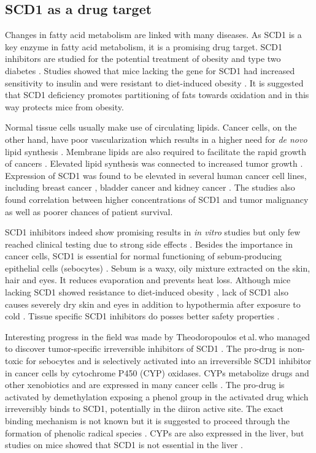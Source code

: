 \subsection{SCD1 as a drug target}
Changes in fatty acid metabolism are linked with many diseases. As SCD1 is a key enzyme in fatty acid metabolism, it is a promising drug target. SCD1 inhibitors are studied for the potential treatment of obesity and type two diabetes \cite{Dobrzyn2005}. Studies showed that mice lacking the gene for SCD1 had increased sensitivity to insulin and were resistant to diet-induced obesity \cite{Ntambi2002}. It is suggested that SCD1 deficiency promotes partitioning of fats towards oxidation and in this way protects mice from obesity.

Normal tissue cells usually make use of circulating lipids. Cancer cells, on the other hand, have poor vascularization which results in a higher need for \textit{de novo} lipid synthesis \cite{Ackerman2014}. Membrane lipids are also required to facilitate the rapid growth of cancers \cite{Snaebjornsson2020}. Elevated lipid synthesis was connected to increased tumor growth \cite{Swinnen2006}. Expression of SCD1 was found to be elevated in several human cancer cell lines, including breast cancer \cite{Holder2013}, bladder cancer \cite{Presler2018} and kidney cancer \cite{Wang2015}. The studies also found correlation between higher concentrations of SCD1 and tumor malignancy as well as poorer chances of patient survival.

SCD1 inhibitors indeed show promising results in \textit{in vitro} studies but only few reached clinical testing due to strong side effects \cite{Zhang2014}. Besides the importance in cancer cells, SCD1 is essential for normal functioning of sebum-producing epithelial cells (sebocytes) \cite{Schneider2010}. Sebum is a waxy, oily mixture extracted on the skin, hair and eyes. It reduces evaporation and prevents heat loss. Although mice lacking SCD1 showed resistance to diet-induced obesity \cite{Ntambi2002}, lack of SCD1 also causes severely dry skin and eyes \cite{Miyazaki2001} in addition to hypothermia after exposure to cold \cite{Lee2004}. Tissue specific SCD1 inhibitors do posses better safety properties \cite{Zhang2014}.

Interesting progress in the field was made by Theodoropoulos et\,al.\,who managed to discover tumor-specific irreversible inhibitors of SCD1 \cite{Theodoropoulos2016}. The pro-drug is non-toxic for sebocytes and is selectively activated into an irreversible SCD1 inhibitor in cancer cells by cytochrome P450 (CYP) oxidases. CYPs metabolize drugs and other xenobiotics and are expressed in many cancer cells \cite{Rodriuez2006}. The pro-drug is activated by demethylation exposing a phenol group in the activated drug which irreversibly binds to SCD1, potentially in the diiron active site. The exact binding mechanism is not known but it is suggested to proceed through the formation of phenolic radical species \cite{Winterton2018}. CYPs are also expressed in the liver, but studies on mice showed that SCD1 is not essential in the liver \cite{Miyazaki2007}.


